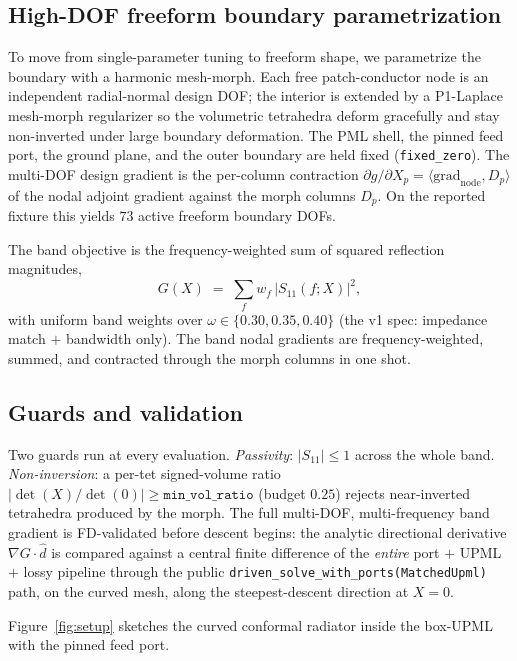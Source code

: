 \documentclass{anvil-paper}
\begin{document}
\subsection{High-DOF freeform boundary parametrization}
\label{sec:morph}

To move from single-parameter tuning to freeform shape, we parametrize the
boundary with a harmonic mesh-morph. Each free patch-conductor node is an
independent radial-normal design DOF; the interior is extended by a P1-Laplace
mesh-morph regularizer so the volumetric tetrahedra deform gracefully and stay
non-inverted under large boundary deformation. The PML shell, the pinned feed
port, the ground plane, and the outer boundary are held fixed
(\texttt{fixed\_zero}). The multi-DOF design gradient is the per-column
contraction $\partial g/\partial X_p = \langle \text{grad}_{\text{node}}, D_p\rangle$
of the nodal adjoint gradient against the morph columns $D_p$. On the reported
fixture this yields $73$ active freeform boundary DOFs.

The band objective is the frequency-weighted sum of squared reflection
magnitudes,
\begin{equation}
  G(X) \;=\; \sum_{f} w_f\,\big|S_{11}(f;X)\big|^2 ,
  \label{eq:objective}
\end{equation}
with uniform band weights over $\omega\in\{0.30,0.35,0.40\}$ (the v1 spec:
impedance match $+$ bandwidth only). The band nodal gradients are
frequency-weighted, summed, and contracted through the morph columns in one
shot.

\subsection{Guards and validation}
\label{sec:guards}

Two guards run at every evaluation. \emph{Passivity}: $|S_{11}|\le 1$ across the
whole band. \emph{Non-inversion}: a per-tet signed-volume ratio
$|\det(X)/\det(0)|\ge \texttt{min\_vol\_ratio}$ (budget $0.25$) rejects
near-inverted tetrahedra produced by the morph. The full multi-DOF,
multi-frequency band gradient is FD-validated before descent begins: the
analytic directional derivative $\nabla G\cdot\hat d$ is compared against a
central finite difference of the \emph{entire} port $+$ UPML $+$ lossy pipeline
through the public \texttt{driven\_solve\_with\_ports(MatchedUpml)} path, on the
curved mesh, along the steepest-descent direction at $X=0$.

Figure~\ref{fig:setup} sketches the curved conformal radiator inside the
box-UPML with the pinned feed port.
\end{document}
